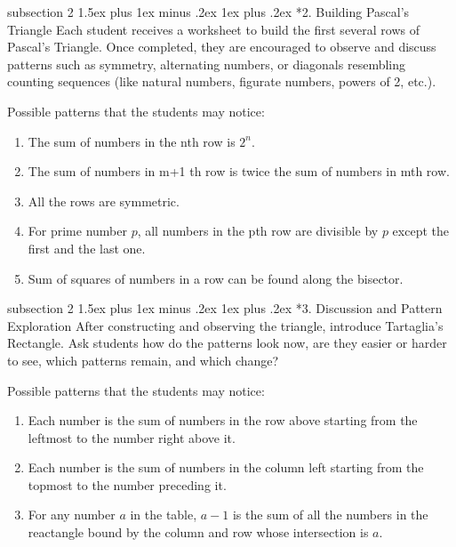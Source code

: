 \documentclass[a4paper,twoside,notitlepage,
11pt,
]{amsart}
\makeatletter
\renewcommand{\subsection}{\@startsection
    {subsection}%
    {2}%
    {\z@}%
    {1.5ex plus 1ex minus .2ex}%
    {1ex plus .2ex}%
    {\normalfont\itshape}}%
\makeatother
\begin{document}
\subsection*{2. Building Pascal's Triangle}
Each student receives a worksheet to build the first several rows of Pascal's Triangle. Once completed, they are encouraged to observe and discuss patterns such as symmetry, alternating numbers, or diagonals resembling counting sequences (like natural numbers, figurate numbers, powers of 2, etc.).
\newpage
\thispagestyle{empty}

\newpage
Possible patterns that the students may notice:
\begin{enumerate}
  \item The sum of numbers in the nth row is \(2^n\).
  \item The sum of numbers in m+1 th row is twice the sum of numbers in mth row.
  \item All the rows are symmetric.
  \item For prime number \(p\), all numbers in the pth row are divisible by \(p\) except the first and the last one.
  \item Sum of squares of numbers in a row can be found along the bisector.
\end{enumerate}
\subsection*{3. Discussion and Pattern Exploration}
After constructing and observing the triangle, introduce Tartaglia's Rectangle. Ask students how do the patterns look now, are they easier or harder to see, which patterns remain, and which change?


Possible patterns that the students may notice:
\begin{enumerate}
  \item Each number is the sum of numbers in the row above starting from the leftmost to the number right above it.
  \item Each number is the sum of numbers in the column left starting from the topmost to the number preceding it.
  \item For any number \(a\) in the table, \(a-1\) is the sum of all the numbers in the reactangle bound by the column and row whose intersection is \(a\).
\end{enumerate}
\end{document}
